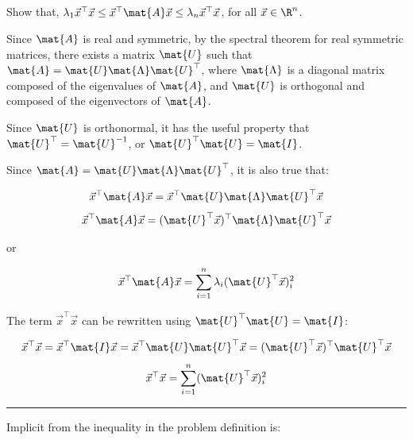 \documentclass{template}
\begin{document}
\subsection{}

Show that,
$\lambda_1 \vec{x}^\top \vec{x} \leq \vec{x}^\top \mat{A} \vec{x} \leq  \lambda_n \vec{x}^\top \vec{x}$, for all $\vec{x} \in \R^n$.

Since $\mat{A}$ is real and symmetric, by the spectral theorem for real symmetric matrices, there exists a matrix $\mat{U}$ such that $\mat{A} = \mat{U}\mat{\Lambda}\mat{U}^\top$, where $\mat{\Lambda}$ is a diagonal matrix composed of the eigenvalues of $\mat{A}$, and $\mat{U}$ is orthogonal and composed of the eigenvectors of $\mat{A}$.

Since $\mat{U}$ is orthonormal, it has the useful property that $\mat{U}^\top = \mat{U}^{-1}$, or $\mat{U}^\top\mat{U} = \mat{I}$.

Since $\mat{A} = \mat{U}\mat{\Lambda}\mat{U}^\top$, it is also true that:

\begin{equation}
    \vec{x}^\top\mat{A}\vec{x} = \vec{x}^\top\mat{U}\mat{\Lambda}\mat{U}^\top\vec{x}
\end{equation}
\begin{equation}
    \vec{x}^\top\mat{A}\vec{x} = (\mat{U}^\top\vec{x})^\top\mat{\Lambda}\mat{U}^\top\vec{x}
\end{equation}

or

\begin{equation}\label{eq:middle-term}
    \vec{x}^\top\mat{A}\vec{x} = \sum_{i=1}^n \lambda_i (\mat{U}^\top\vec{x})_i^2
\end{equation}

The term $\vec{x}^\top \vec{x}$ can be rewritten using $\mat{U}^\top\mat{U} = \mat{I}$:

\begin{equation}
    \vec{x}^\top \vec{x} = \vec{x}^\top \mat{I} \vec{x} = \vec{x}^\top\mat{U}\mat{U}^\top \vec{x} = (\mat{U}^\top \vec{x})^\top\mat{U}^\top \vec{x}
\end{equation}
\begin{equation}\label{eq:end-terms}
     \vec{x}^\top \vec{x} = \sum_{i=1}^n (\mat{U}^\top\vec{x})_i^2
\end{equation}



\hrule



Implicit from the inequality in the problem definition is:
\end{document}
